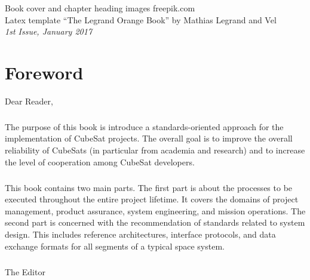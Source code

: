 \documentclass[11pt,fleqn]{book} %
\begin{document}
\noindent Book cover and chapter heading images \textcopyright freepik.com \\

\noindent Latex template ``The Legrand Orange Book'' by Mathias Legrand and Vel \\

\noindent \textit{1st Issue, January 2017} %


\chapter*{Foreword}

Dear Reader,

\paragraph{}

The purpose of this book is introduce a standards-oriented approach for the implementation of CubeSat projects. The overall goal is to improve the overall reliability of CubeSats (in particular from academia and research) and to increase the level of cooperation among CubeSat developers.  

\paragraph{}

This book contains two main parts. The first part is about the processes to be executed throughout the entire project lifetime. It covers the domains of project management, product assurance, system engineering, and mission operations. The second part is concerned with the recommendation of standards related to system design. This includes reference architectures, interface protocols, and data exchange formats for all segments of a typical space system. 

\paragraph{}

\begin{flushright}
The Editor
\end{flushright}
\end{document}
